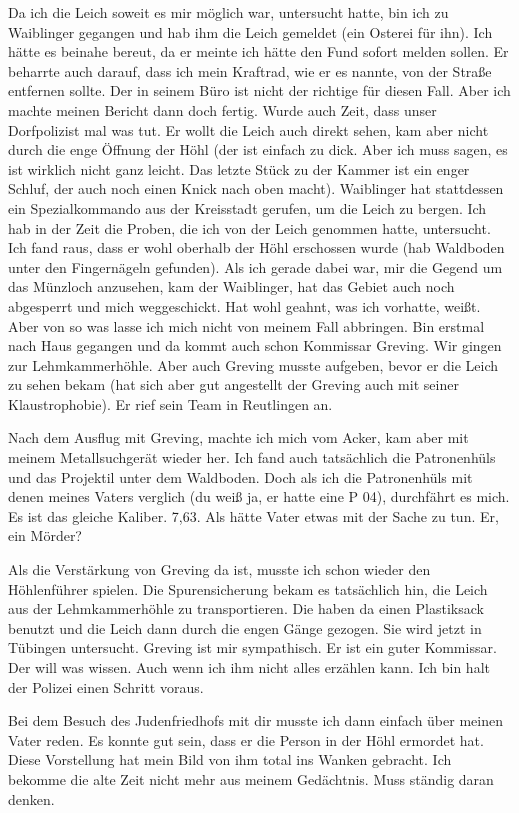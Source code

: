 Da ich die Leich soweit es mir möglich war, untersucht hatte, bin ich zu Waiblinger gegangen und hab
ihm die Leich gemeldet (ein Osterei für ihn). Ich hätte es beinahe bereut, da er meinte ich hätte
den Fund sofort melden sollen. Er beharrte auch darauf, dass ich mein Kraftrad, wie er es nannte,
von der Straße entfernen sollte. Der in seinem Büro ist nicht der richtige für diesen Fall. Aber ich
machte meinen Bericht dann doch fertig. Wurde auch Zeit, dass unser Dorfpolizist mal was tut. Er
wollt die Leich auch direkt sehen, kam aber nicht durch die enge Öffnung der Höhl (der ist einfach
zu dick. Aber ich muss sagen, es ist wirklich nicht ganz leicht. Das letzte Stück zu der Kammer ist
ein enger Schluf, der auch noch einen Knick nach oben macht). Waiblinger hat stattdessen ein
Spezialkommando aus der Kreisstadt gerufen, um die Leich zu bergen. Ich hab in der Zeit die Proben,
die ich von der Leich genommen hatte, untersucht. Ich fand raus, dass er wohl oberhalb der Höhl
erschossen wurde (hab Waldboden unter den Fingernägeln gefunden). Als ich gerade dabei war, mir die
Gegend um das Münzloch anzusehen, kam der Waiblinger, hat das Gebiet auch noch abgesperrt und mich
weggeschickt. Hat wohl geahnt, was ich vorhatte, weißt. Aber von so was lasse ich mich nicht von
meinem Fall abbringen. Bin erstmal nach Haus gegangen und da kommt auch schon Kommissar Greving. Wir
gingen zur Lehmkammerhöhle. Aber auch Greving musste aufgeben, bevor er die Leich zu sehen bekam
(hat sich aber gut angestellt der Greving auch mit seiner Klaustrophobie). Er rief sein Team in
Reutlingen an.

Nach dem Ausflug mit Greving, machte ich mich vom Acker, kam aber mit meinem Metallsuchgerät wieder
her. Ich fand auch tatsächlich die Patronenhüls und das Projektil unter dem Waldboden. Doch als ich
die Patronenhüls mit denen meines Vaters verglich (du weiß ja, er hatte eine P 04),
durchfährt es mich. Es ist das gleiche Kaliber. 7,63. Als hätte Vater etwas mit der Sache zu tun.
Er, ein Mörder?

Als die Verstärkung von Greving da ist, musste ich schon wieder den Höhlenführer spielen. Die
Spurensicherung bekam es tatsächlich hin, die Leich aus der Lehmkammerhöhle zu transportieren. Die
haben da einen Plastiksack benutzt und die Leich dann durch die engen Gänge gezogen. Sie wird jetzt
in Tübingen untersucht. Greving ist mir sympathisch. Er ist ein guter Kommissar. Der will was
wissen. Auch wenn ich ihm nicht alles erzählen kann. Ich bin halt der Polizei einen Schritt voraus.

Bei dem Besuch des Judenfriedhofs mit dir musste ich dann einfach über meinen Vater reden. Es konnte
gut sein, dass er die Person in der Höhl ermordet hat. Diese Vorstellung hat mein Bild von ihm
total ins Wanken gebracht. Ich bekomme die alte Zeit nicht mehr aus meinem Gedächtnis. Muss ständig
daran denken.

